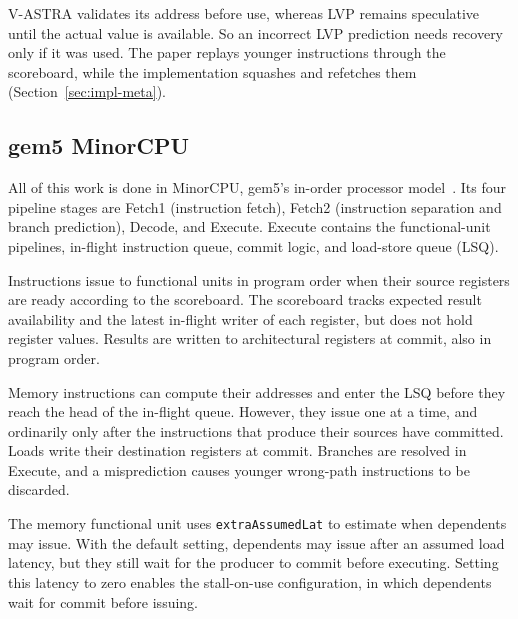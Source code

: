 V-ASTRA
validates its address before use, whereas LVP remains speculative
until the actual value is available. So an incorrect LVP prediction
needs recovery only if it was used. The paper replays younger
instructions through the scoreboard, while the implementation squashes and
refetches them (Section~\ref{sec:impl-meta}).

\subsection{gem5 MinorCPU}
\label{sec:bg-minor}

All of this work is done in MinorCPU, gem5's in-order processor
model~\cite{gem5}. Its four pipeline stages are Fetch1 (instruction fetch),
Fetch2 (instruction separation and branch prediction), Decode, and
Execute. Execute contains the functional-unit pipelines, in-flight
instruction queue, commit logic, and load-store queue (LSQ).

Instructions issue to functional units in program order when their
source registers are ready according to the scoreboard. The
scoreboard tracks expected result availability and the latest
in-flight writer of each register, but does not hold register values.
Results are written to architectural registers at commit, also in
program order.

Memory instructions can compute their addresses and enter the LSQ
before they reach the head of the in-flight queue. However, they
issue one at a time, and ordinarily only after the instructions that
produce their sources have committed. Loads write their destination
registers at commit. Branches are resolved in Execute, and a
misprediction causes younger wrong-path instructions to be discarded.

The memory functional unit uses \texttt{extraAssumedLat} to estimate
when dependents may issue. With the default setting, dependents may
issue after an assumed load latency, but they still wait for the
producer to commit before executing. Setting this latency to zero
enables the stall-on-use configuration, in which dependents wait for
commit before issuing.
